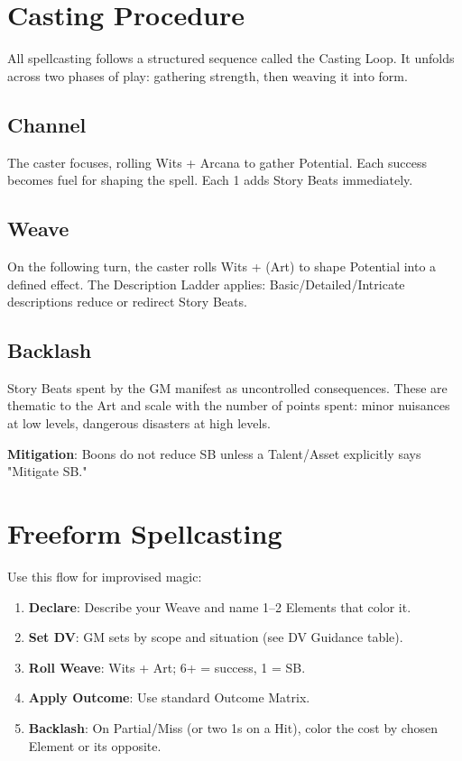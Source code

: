 \section{Casting Procedure}

All spellcasting follows a structured sequence called the Casting Loop. It unfolds across two phases of play: gathering strength, then weaving it into form.

\subsection{Channel}
The caster focuses, rolling Wits + Arcana to gather Potential. Each success becomes fuel for shaping the spell. Each 1 adds Story Beats immediately.

\subsection{Weave}
On the following turn, the caster rolls Wits + (Art) to shape Potential into a defined effect. The Description Ladder applies: Basic/Detailed/Intricate descriptions reduce or redirect Story Beats.

\subsection{Backlash}
Story Beats spent by the GM manifest as uncontrolled consequences. These are thematic to the Art and scale with the number of points spent: minor nuisances at low levels, dangerous disasters at high levels.

\textbf{Mitigation}: Boons do not reduce SB unless a Talent/Asset explicitly says "Mitigate SB."

\section{Freeform Spellcasting}

Use this flow for improvised magic:

\begin{enumerate}
  \item \textbf{Declare}: Describe your Weave and name 1–2 Elements that color it.
  \item \textbf{Set DV}: GM sets by scope and situation (see DV Guidance table).
  \item \textbf{Roll Weave}: Wits + Art; 6+ = success, 1 = SB.
  \item \textbf{Apply Outcome}: Use standard Outcome Matrix.
  \item \textbf{Backlash}: On Partial/Miss (or two 1s on a Hit), color the cost by chosen Element or its opposite.
\end{enumerate}

